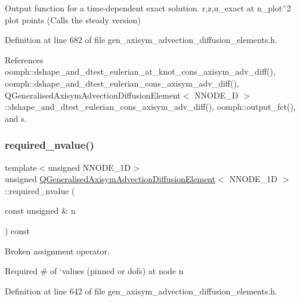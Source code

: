 Output function for a time-\/dependent exact solution. r,z,u\+\_\+exact at n\+\_\+plot$^\wedge$2 plot points (Calls the steady version) 



Definition at line 682 of file gen\+\_\+axisym\+\_\+advection\+\_\+diffusion\+\_\+elements.\+h.



References oomph\+::dshape\+\_\+and\+\_\+dtest\+\_\+eulerian\+\_\+at\+\_\+knot\+\_\+cons\+\_\+axisym\+\_\+adv\+\_\+diff(), oomph\+::dshape\+\_\+and\+\_\+dtest\+\_\+eulerian\+\_\+cons\+\_\+axisym\+\_\+adv\+\_\+diff(), Q\+Generalised\+Axisym\+Advection\+Diffusion\+Element$<$ N\+N\+O\+D\+E\+\_\+D $>$\+::dshape\+\_\+and\+\_\+dtest\+\_\+eulerian\+\_\+cons\+\_\+axisym\+\_\+adv\+\_\+diff(), oomph\+::output\+\_\+fct(), and s.

\mbox{\label{classQGeneralisedAxisymAdvectionDiffusionElement_a90c0ea92a8f9f454c072f485d8b5ba6c}} 
\subsubsection{\texorpdfstring{required\+\_\+nvalue()}{required\_nvalue()}}
{\footnotesize\ttfamily template$<$unsigned N\+N\+O\+D\+E\+\_\+1D$>$ \\
unsigned \hyperlink{classQGeneralisedAxisymAdvectionDiffusionElement}{Q\+Generalised\+Axisym\+Advection\+Diffusion\+Element}$<$ N\+N\+O\+D\+E\+\_\+1D $>$\+::required\+\_\+nvalue (\begin{DoxyParamCaption}\item[{const unsigned \&}]{n }\end{DoxyParamCaption}) const\hspace{0.3cm}{\ttfamily [inline]}}



Broken assignment operator. 

Required \# of `values\textquotesingle{} (pinned or dofs) at node n 

Definition at line 642 of file gen\+\_\+axisym\+\_\+advection\+\_\+diffusion\+\_\+elements.\+h.



